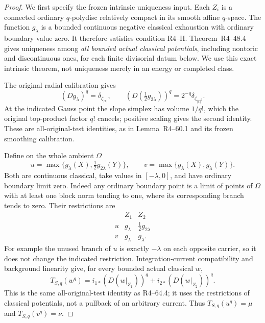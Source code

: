 \documentclass[11pt,a4paper]{article}
\numberwithin{equation}{section}
\theoremstyle{definition}
\theoremstyle{remark}
\begin{document}
\begin{proof}
We first specify the frozen intrinsic uniqueness input. Each $Z_i$
is a connected ordinary $q$-polydisc relatively compact in its smooth
affine $q$-space. The function $g_\lambda$ is a bounded continuous
negative classical exhaustion with ordinary boundary value zero.
It therefore satisfies condition \textup{R4--H}.
Theorem~\textup{R4--48.4} gives uniqueness among
\emph{all bounded actual classical potentials}, including nontoric
and discontinuous ones, for each finite divisorial datum below.
We use this exact intrinsic theorem, not uniqueness merely in an
energy or completed class.

The original radial calibration gives
\[
          (Dg_\lambda)^q=\delta_{\zeta_{|\pi|}},\qquad
          (D(\tfrac12 g_{2\lambda}))^q
                                  =2^{-q}\delta_{\zeta_{|\pi|^2}}.
\]
At the indicated Gauss point the slope simplex has volume $1/q!$,
which the original top-product factor $q!$ cancels; positive scaling
gives the second identity. These are all-original-test identities,
as in Lemma~\textup{R4--60.1} and its frozen
smoothing calibration.

Define on the whole ambient $\Omega$
\[
       u=\max\{g_\lambda(X),\tfrac12 g_{2\lambda}(Y)\},
               \qquad
       v=\max\{g_\lambda(X),g_\lambda(Y)\}.
\]
Both are continuous classical, take values in $[-\lambda,0]$, and
have ordinary boundary limit zero. Indeed any ordinary boundary
point is a limit of points of $\Omega$ with at least one block norm
tending to one, where its corresponding branch tends to zero.
Their restrictions are
\[
 \begin{array}{c|cc}
       &Z_1&Z_2\\ \hline
  u&g_\lambda&\tfrac12 g_{2\lambda}\\
  v&g_\lambda&g_\lambda.
 \end{array}
\]
For example the unused branch of $u$ is exactly $-\lambda$ on
each opposite carrier, so it does not change the indicated restriction.
Integration-current compatibility and background linearity give,
for every bounded actual classical $w$,
\begin{equation}
 T_{S,q}(w^q)
   =i_{1*}(D(w|_{Z_1}))^q+i_{2*}(D(w|_{Z_2}))^q.
 \label{eq:r6-nonconvex-carrier-splitting}
\end{equation}
This is the same all-original-test identity as
\textup{R4--64.4}; it uses the restrictions of
classical potentials, not a pullback of an arbitrary current.
Thus $T_{S,q}(u^q)=\mu$ and $T_{S,q}(v^q)=\nu$.


\end{proof}
\end{document}
